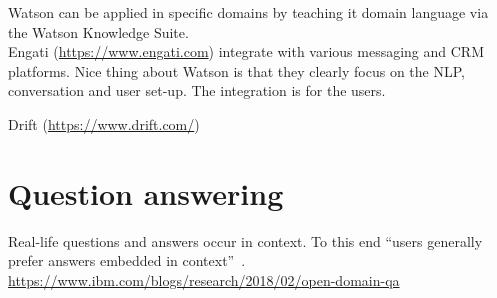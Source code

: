 Watson can be applied in specific domains by teaching it domain language via the Watson Knowledge Suite. \\





Engati (\url{https://www.engati.com}) integrate with various messaging and CRM platforms.
Nice thing about Watson is that they clearly focus on the NLP, conversation and user set-up.
The integration is for the users.

Drift (\url{https://www.drift.com/})

\section{Question answering}
\label{sec:question_answering}

Real-life questions and answers occur in context.
To this end ``users generally prefer answers embedded in context''~\cite{lin2003makes}. \\

\url{https://www.ibm.com/blogs/research/2018/02/open-domain-qa}